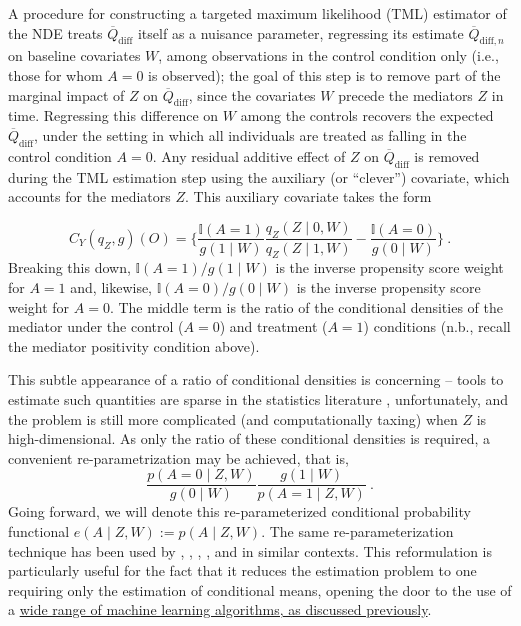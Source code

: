 \documentclass[
  12pt, krantz2,
]{krantz}
\newcommand{\1}{\mathbbm{1}}
\theoremstyle{definition}
\theoremstyle{definition}
\theoremstyle{definition}
\theoremstyle{definition}
\theoremstyle{remark}
\begin{document}
A procedure for constructing a targeted maximum likelihood (TML) estimator of
the NDE treats \(\overline{Q}_{\text{diff}}\) itself as a nuisance parameter,
regressing its estimate \(\overline{Q}_{\text{diff}, n}\) on baseline covariates
\(W\), among observations in the control condition only (i.e., those for whom
\(A = 0\) is observed); the goal of this step is to remove part of the marginal
impact of \(Z\) on \(\overline{Q}_{\text{diff}}\), since the covariates \(W\) precede
the mediators \(Z\) in time. Regressing this difference on \(W\) among the controls
recovers the expected \(\overline{Q}_{\text{diff}}\), under the setting in which
all individuals are treated as falling in the control condition \(A = 0\). Any
residual additive effect of \(Z\) on \(\overline{Q}_{\text{diff}}\) is removed
during the TML estimation step using the auxiliary (or ``clever'') covariate,
which accounts for the mediators \(Z\). This auxiliary covariate takes the form

\begin{equation*}
  C_Y(q_Z, g)(O) = \Bigg\{\frac{\mathbb{I}(A = 1)}{g(1 \mid W)}
  \frac{q_Z(Z \mid 0, W)}{q_Z(Z \mid 1, W)} -
  \frac{\mathbb{I}(A = 0)}{g(0 \mid W)} \Bigg\} \ .
\end{equation*}
Breaking this down, \(\mathbb{I}(A = 1) / g(1 \mid W)\) is the inverse propensity
score weight for \(A = 1\) and, likewise, \(\mathbb{I}(A = 0) / g(0 \mid W)\) is the
inverse propensity score weight for \(A = 0\). The middle term is the ratio of the
conditional densities of the mediator under the control (\(A = 0\)) and treatment
(\(A = 1\)) conditions (n.b., recall the mediator positivity condition above).

This subtle appearance of a ratio of conditional densities is concerning --
tools to estimate such quantities are sparse in the statistics literature
\citep{diaz2011super, hejazi2020haldensify}, unfortunately, and the problem is still
more complicated (and computationally taxing) when \(Z\) is high-dimensional. As
only the ratio of these conditional densities is required, a convenient
re-parametrization may be achieved, that is,
\begin{equation*}
  \frac{p(A = 0 \mid Z, W)}{g(0 \mid W)}
  \frac{g(1 \mid W)}{p(A = 1 \mid Z, W)} \ .
\end{equation*}
Going forward, we will denote this re-parameterized conditional probability
functional \(e(A \mid Z, W) := p(A \mid Z, W)\). The same re-parameterization
technique has been used by \citet{zheng2012targeted}, \citet{tchetgen2013inverse},
\citet{diaz2020causal}, \citet{diaz2020nonparametric}, and \citet{hejazi2021nonparametric} in similar
contexts. This reformulation is particularly useful for the fact that it reduces
the estimation problem to one requiring only the estimation of conditional
means, opening the door to the use of a \protect\hyperlink{sl3}{wide range of machine learning
algorithms, as discussed previously}.
\end{document}
